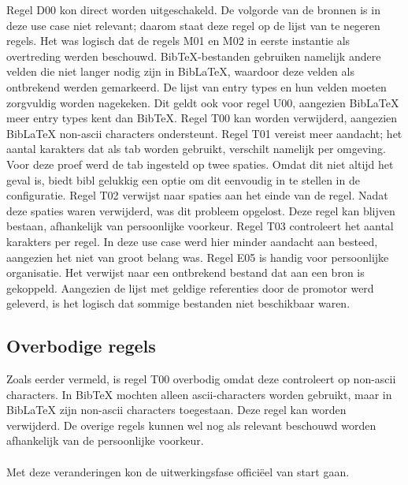 Regel D00 kon direct worden uitgeschakeld. De volgorde van de bronnen is in deze use case niet relevant; daarom staat deze regel op de lijst van te negeren regels. 
Het was logisch dat de regels M01 en M02 in eerste instantie als overtreding werden beschouwd. BibTeX-bestanden gebruiken namelijk andere velden die niet langer nodig zijn in BibLaTeX, waardoor deze velden als ontbrekend werden gemarkeerd. De lijst van entry types en hun velden moeten zorgvuldig worden nagekeken. Dit geldt ook voor regel U00, aangezien BibLaTeX meer entry types kent dan BibTeX. 
Regel T00 kan worden verwijderd, aangezien BibLaTeX non-ascii characters ondersteunt. Regel T01 vereist meer aandacht; het aantal karakters dat als tab worden gebruikt, verschilt namelijk per omgeving. Voor deze proef werd de tab ingesteld op twee spaties. Omdat dit niet altijd het geval is, biedt bibl gelukkig een optie om dit eenvoudig in te stellen in de configuratie.
Regel T02 verwijst naar spaties aan het einde van de regel. Nadat deze spaties waren verwijderd, was dit probleem opgelost. Deze regel kan blijven bestaan, afhankelijk van persoonlijke voorkeur.
Regel T03 controleert het aantal karakters per regel. In deze use case werd hier minder aandacht aan besteed, aangezien het niet van groot belang was.
Regel E05 is handig voor persoonlijke organisatie. Het verwijst naar een ontbrekend bestand dat aan een bron is gekoppeld. Aangezien de lijst met geldige referenties door de promotor werd geleverd, is het logisch dat sommige bestanden niet beschikbaar waren.

\subsection{Overbodige regels}
Zoals eerder vermeld, is regel T00 overbodig omdat deze controleert op non-ascii characters. In BibTeX mochten alleen ascii-characters worden gebruikt, maar in BibLaTeX zijn non-ascii characters toegestaan. Deze regel kan worden verwijderd. De overige regels kunnen wel nog als relevant beschouwd worden afhankelijk van de persoonlijke voorkeur.
\\
\\
Met deze veranderingen kon de uitwerkingsfase officiëel van start gaan.
